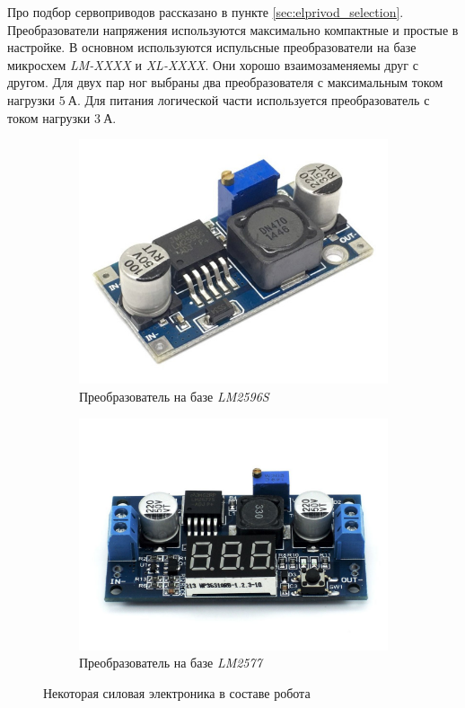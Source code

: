 Про подбор сервоприводов рассказано в пункте \ref{sec:elprivod_selection}. Преобразователи напряжения используются максимально компактные и простые в настройке. В основном используются испульсные преобразователи на базе микросхем \textit{LM-XXXX} и \textit{XL-XXXX}. Они хорошо взаимозаменяемы друг с другом. Для двух пар ног выбраны два преобразователя с максимальным током нагрузки $ 5 \: А $. Для питания логической части используется преобразователь с током нагрузки $ 3 \: А $.
\begin{figure}[ht]
    \centering
    \begin{subfigure}[b]{0.45\textwidth}    
        \centering
        \includegraphics[scale=0.30]{chapter_mechanics_construction/figure4.jpg}
        \caption{Преобразователь на базе \textit{LM2596S}}
    \end{subfigure}
    \begin{subfigure}[b]{0.45\textwidth}
        \centering
        \includegraphics[scale=0.15]{chapter_mechanics_construction/figure5.jpg}
        \caption{Преобразователь на базе \textit{LM2577}}
    \end{subfigure}
     
    \caption{Некоторая силовая электроника в составе робота}
    \label{}
\end{figure}

